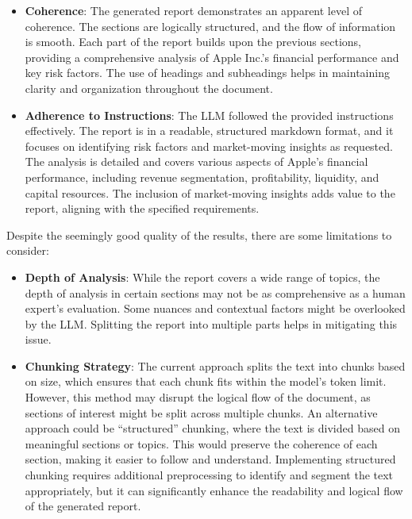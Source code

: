 \begin{itemize}
\item \textbf{Coherence}: The generated report demonstrates an apparent level of coherence. The sections are logically structured, and the flow of information is smooth. Each part of the report builds upon the previous sections, providing a comprehensive analysis of Apple Inc.'s financial performance and key risk factors. The use of headings and subheadings helps in maintaining clarity and organization throughout the document.

\item \textbf{Adherence to Instructions}: The LLM followed the provided instructions effectively. The report is in a readable, structured markdown format, and it focuses on identifying risk factors and market-moving insights as requested. The analysis is detailed and covers various aspects of Apple's financial performance, including revenue segmentation, profitability, liquidity, and capital resources. The inclusion of market-moving insights adds value to the report, aligning with the specified requirements.
\end{itemize}

Despite the seemingly good quality of the results, there are some limitations to consider:

\begin{itemize}
\item \textbf{Depth of Analysis}: While the report covers a wide range of topics, the depth of analysis in certain sections may not be as comprehensive as a human expert's evaluation. Some nuances and contextual factors might be overlooked by the LLM. Splitting the report into multiple parts helps in mitigating this issue.

\item \textbf{Chunking Strategy}: The current approach splits the text into chunks based on size, which ensures that each chunk fits within the model's token limit. However, this method may disrupt the logical flow of the document, as sections of interest might be split across multiple chunks. An alternative approach could be ``structured'' chunking, where the text is divided based on meaningful sections or topics. This would preserve the coherence of each section, making it easier to follow and understand. Implementing structured chunking requires additional preprocessing to identify and segment the text appropriately, but it can significantly enhance the readability and logical flow of the generated report.
\end{itemize}

